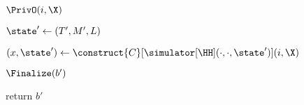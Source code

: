 \begin{figure}[tp]
	\begin{minipage}[t]{0.48\textwidth}
		\NewExperiment[Game $\Gm_9$, $\Gm_{10}$, $\Gm_{11}$]
		
		\begin{algorithm}{$\PrivO(i,\X)$}
			\item $\state' \gets (T', M', L)$
			\item $(x, \state') \gets \construct{C}[\simulator[\HH](\cdot, \cdot, \state')](i, \X)$
			\item {}
		\end{algorithm}	
		\ExptSepSpace
		\begin{oracle}{$\Finalize(b')$ }
			\item return $b'$
		\end{oracle}
	\end{minipage}
	

\end{figure}
